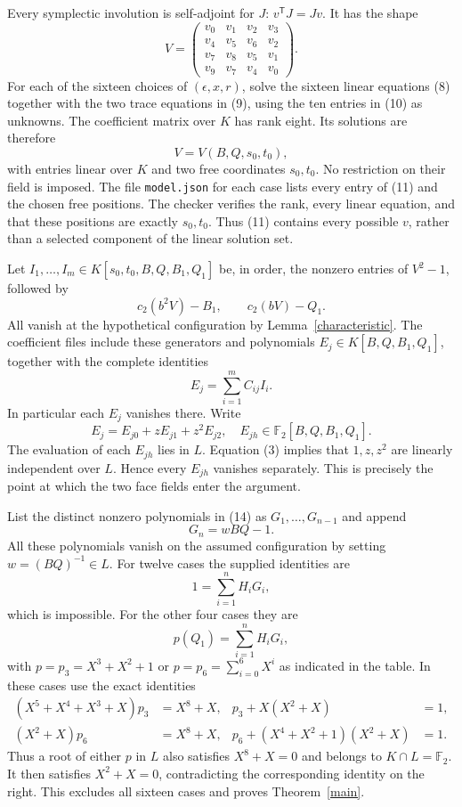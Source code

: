 \documentclass[11pt,a4paper]{article}
\newcommand{\F}{\mathbb F}
\begin{document}
Every symplectic involution is self-adjoint for $J$:
$v^{\mathsf T}J=Jv$. It has the shape
\[
 V=\begin{pmatrix}
 v_0&v_1&v_2&v_3\\v_4&v_5&v_6&v_2\\
 v_7&v_8&v_5&v_1\\v_9&v_7&v_4&v_0
 \end{pmatrix}.                                      \tag{10}
\]
For each of the sixteen choices of $(\epsilon,x,r)$, solve the
sixteen linear equations (8) together with the two trace equations
in (9), using the ten entries in (10) as unknowns. The coefficient
matrix over $K$ has rank eight. Its solutions are therefore
\[
             V=V(B,Q,s_0,t_0),                       \tag{11}
\]
with entries linear over $K$ and two free coordinates $s_0,t_0$.
No restriction on their field is imposed. The file
\texttt{model.json} for each case lists every entry of (11) and the
chosen free positions. The checker verifies the rank, every linear
equation, and that these positions are exactly $s_0,t_0$.
Thus (11) contains every possible $v$, rather than a selected
component of the linear solution set.

Let $I_1,\ldots,I_m\in K[s_0,t_0,B,Q,B_1,Q_1]$ be, in order,
the nonzero entries of $V^2-1$, followed by
\[
 c_2(b^2V)-B_1,\qquad c_2(bV)-Q_1.                    \tag{12}
\]
All vanish at the hypothetical configuration by
Lemma~\ref{characteristic}. The coefficient files include these
generators and polynomials $E_j\in K[B,Q,B_1,Q_1]$, together with
the complete identities
\[
                 E_j=\sum_{i=1}^m C_{ij}I_i.         \tag{13}
\]
In particular each $E_j$ vanishes there. Write
\[
                 E_j=E_{j0}+zE_{j1}+z^2E_{j2},
        \quad E_{jh}\in\F_2[B,Q,B_1,Q_1].            \tag{14}
\]
The evaluation of each $E_{jh}$ lies in $L$. Equation (3) implies
that $1,z,z^2$ are linearly independent over $L$. Hence every
$E_{jh}$ vanishes separately. This is precisely the point at which
the two face fields enter the argument.

List the distinct nonzero polynomials in (14) as
$G_1,\ldots,G_{n-1}$ and append
\[
                 G_n=wBQ-1.                         \tag{15}
\]
All these polynomials vanish on the assumed configuration by setting
$w=(BQ)^{-1}\in L$. For twelve cases the supplied identities are
\[
                 1=\sum_{i=1}^n H_iG_i,             \tag{16}
\]
which is impossible. For the other four cases they are
\[
                 p(Q_1)=\sum_{i=1}^n H_iG_i,         \tag{17}
\]
with $p=p_3=X^3+X^2+1$ or $p=p_6=\sum_{i=0}^6X^i$ as indicated
in the table. In these cases use the exact identities
\begin{align*}
 (X^5+X^4+X^3+X)p_3&=X^8+X,&
 p_3+X(X^2+X)&=1,\\
 (X^2+X)p_6&=X^8+X,&
 p_6+(X^4+X^2+1)(X^2+X)&=1.
\end{align*}
Thus a root of either $p$ in $L$ also satisfies $X^8+X=0$ and
belongs to $K\cap L=\F_2$. It then satisfies $X^2+X=0$, contradicting
the corresponding identity on the right. This excludes all sixteen
cases and proves Theorem~\ref{main}.
\end{document}
